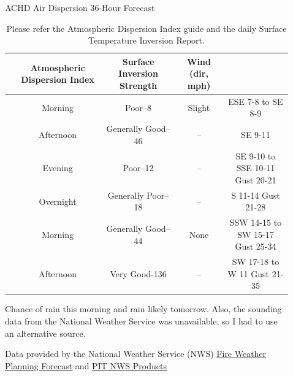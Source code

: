 \documentclass[final,xcolor=table]{beamer}
\newlength{\sepwidth}
\newlength{\colwidth}
\newcommand{\separatorcolumn}{\begin{column}{\sepwidth}\end{column}}
\begin{document}
\begin{frame}[t]
\begin{columns}[t]
\begin{column}{\colwidth}
\begin{block}{ACHD Air Dispersion 36-Hour Forecast}
    \begin{table}
      \renewcommand{\arraystretch}{1.5}
      \centering
      \begin{adjustbox}{width=1\textwidth}
      \begin{tabular}{ |c|c|c|c|c|}
          \hline
          \rowcolor{lightgray}\multicolumn{2}{|c|}{\textbf{Forecast Period}} & \textbf{Atmospheric Dispersion Index} & \textbf{Surface Inversion Strength} & \textbf{Wind (dir, mph)}\\
          \hline
          \rowcolor[HTML]{F2FDFE}{\textbf{Today}} & Morning & Poor–8 & Slight & ESE 7-8 to SE 8-9 \\ 
          \rowcolor[HTML]{F2FDFE} & Afternoon & Generally Good–46 & -- & SE 9-11 \\
          \hline
          \rowcolor[HTML]{F2FDFE}{\textbf{Tonight}} & Evening  & Poor–12 & -- & SE 9-10 to SSE 10-11 Gust 20-21\\
          \rowcolor[HTML]{F2FDFE} & Overnight & Generally Poor–18 & -- & S 11-14 Gust 21-28\\
          \hline
          \rowcolor[HTML]{F2FDFE}{\textbf{Tomorrow}} & Morning & Generally Good–44 & None & SSW 14-15 to SW 15-17 Gust 25-34\\
          \rowcolor[HTML]{F2FDFE} & Afternoon & Very Good-136 & -- & SW 17-18 to W 11 Gust 21-35\\
          \hline
      \end{tabular}
      \end{adjustbox}
      \caption{Please refer the Atmospheric Dispersion Index guide and the daily Surface Temperature Inversion Report.}
    \end{table}

    Chance of rain this morning and rain likely tomorrow. Also, the sounding data from the National Weather Service was unavailable, so I had to use an alternative source.
    
    Data provided by the National Weather Service (NWS)
    \href{https://forecast.weather.gov/product.php?site=NWS&product=FWF&issuedby=PBZ}{\underline{Fire Weather Planning Forecast}} and \href{http://weather.uwyo.edu/upperair/sounding.html}{\underline{PIT NWS Products}}

  \end{block}
  
\end{column}

\separatorcolumn

\begin{column}{\colwidth}


\end{column}
\end{columns}
\end{frame}
\end{document}
